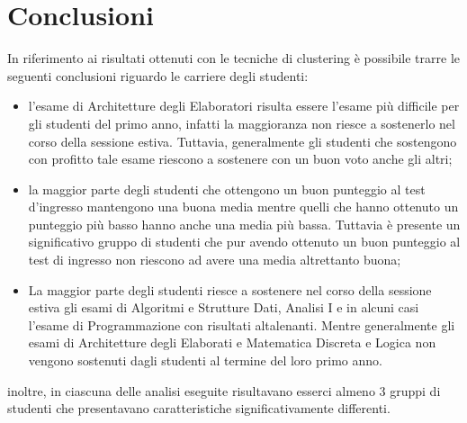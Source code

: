 \documentclass[12pt]{article}
\begin{document}
\section{Conclusioni}
In riferimento ai risultati ottenuti con le tecniche di clustering è possibile trarre le seguenti conclusioni riguardo
le carriere degli studenti:

\begin{itemize}
\item l'esame di Architetture degli Elaboratori risulta essere l'esame più difficile per gli studenti del primo anno,
  infatti la maggioranza non riesce a sostenerlo nel corso della sessione estiva. Tuttavia, generalmente gli studenti 
  che sostengono con profitto tale esame riescono a sostenere con un buon voto anche gli altri; 
\item la maggior parte degli studenti che ottengono un buon punteggio al test d'ingresso mantengono una buona media
  mentre quelli che hanno ottenuto un punteggio più basso hanno anche una media più bassa. Tuttavia è presente
  un significativo gruppo di studenti che pur avendo ottenuto un buon punteggio al test di ingresso non riescono
  ad avere una media altrettanto buona;
\item La maggior parte degli studenti riesce a sostenere nel corso della sessione estiva gli esami di Algoritmi e 
  Strutture Dati, Analisi I e in alcuni casi l'esame di Programmazione con risultati altalenanti. Mentre 
  generalmente gli esami di Architetture degli Elaborati e Matematica Discreta e Logica non vengono sostenuti
  dagli studenti al termine del loro primo anno.
\end{itemize}

inoltre, in ciascuna delle analisi eseguite risultavano esserci almeno 3 gruppi di studenti che presentavano 
caratteristiche significativamente differenti.

\newpage 

\listoffigures
 
\newpage


\listoftables

\newpage

\end{document}
